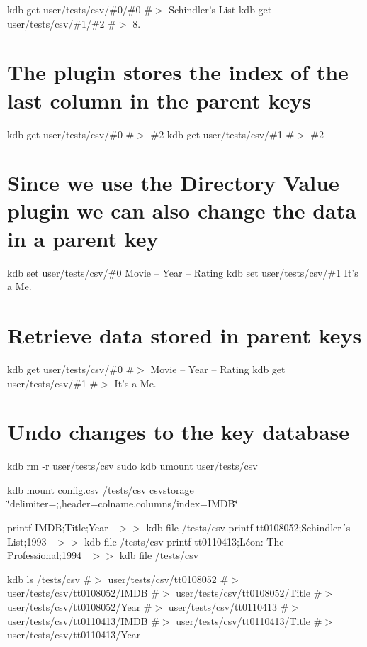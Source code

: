 kdb get user/tests/csv/\#0/\#0 \#$>$ Schindler’s List kdb get user/tests/csv/\#1/\#2 \#$>$ 8.\hypertarget{autotoc_md126_autotoc_md145}{}\section{The plugin stores the index of the last column in the parent keys}\label{autotoc_md126_autotoc_md145}
kdb get user/tests/csv/\#0 \#$>$ \#2 kdb get user/tests/csv/\#1 \#$>$ \#2\hypertarget{autotoc_md126_autotoc_md146}{}\section{Since we use the Directory Value plugin we can also change the data in a parent key}\label{autotoc_md126_autotoc_md146}
kdb set user/tests/csv/\#0 \textquotesingle{}Movie – Year – Rating\textquotesingle{} kdb set user/tests/csv/\#1 \textquotesingle{}It’s a Me.\textquotesingle{}\hypertarget{autotoc_md126_autotoc_md147}{}\section{Retrieve data stored in parent keys}\label{autotoc_md126_autotoc_md147}
kdb get user/tests/csv/\#0 \#$>$ Movie – Year – Rating kdb get user/tests/csv/\#1 \#$>$ It’s a Me.\hypertarget{autotoc_md126_autotoc_md148}{}\section{Undo changes to the key database}\label{autotoc_md126_autotoc_md148}
kdb rm -\/r user/tests/csv sudo kdb umount user/tests/csv 
\begin{DoxyCode}{0}
\end{DoxyCode}
 kdb mount config.\+csv /tests/csv csvstorage \char`\"{}delimiter=;,header=colname,columns/index=\+I\+M\+D\+B\char`\"{}

printf \textquotesingle{}I\+M\+DB;Title;Year~\newline
\textquotesingle{} $>$$>$ {\ttfamily kdb file /tests/csv} printf \textquotesingle{}tt0108052;Schindler´s List;1993~\newline
\textquotesingle{} $>$$>$ {\ttfamily kdb file /tests/csv} printf \textquotesingle{}tt0110413;Léon\+: The Professional;1994~\newline
\textquotesingle{} $>$$>$ {\ttfamily kdb file /tests/csv}

kdb ls /tests/csv \#$>$ user/tests/csv/tt0108052 \#$>$ user/tests/csv/tt0108052/\+I\+M\+DB \#$>$ user/tests/csv/tt0108052/\+Title \#$>$ user/tests/csv/tt0108052/\+Year \#$>$ user/tests/csv/tt0110413 \#$>$ user/tests/csv/tt0110413/\+I\+M\+DB \#$>$ user/tests/csv/tt0110413/\+Title \#$>$ user/tests/csv/tt0110413/\+Year

